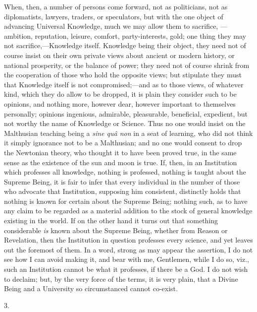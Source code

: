 When, then, a number of persons come forward, not as politicians,
not as diplomatists, lawyers, traders, or speculators, but with the
one object of advancing Universal Knowledge, much we may allow them to
sacrifice, —ambition, reputation, leisure, comfort,
party-interests, gold; one thing they may not sacrifice,—Knowledge
itself. Knowledge being their object, they need not of course insist
on their own private views about ancient or modern history, or
national prosperity, or the balance of power; they need not of course
shrink from the cooperation of those who hold the opposite views; but
stipulate they must that Knowledge itself is not compromised;—and as
to those views, of whatever kind, which they do allow to be dropped,
it is plain they consider such to be opinions, and nothing more,
however dear, however important to themselves personally; opinions
ingenious, admirable, pleasurable, beneficial, expedient, but not
worthy the name of Knowledge or Science. Thus no one would insist on
the Malthusian teaching being a \emph{sine quâ non} in a seat of
learning, who did not think it simply ignorance not to be a
Malthusian; and no one would consent to drop the Newtonian theory, who
thought it to have been proved true, in the same sense as the
existence of the sun and moon is true. If, then, in an Institution
which professes all knowledge, nothing is professed, nothing is taught
about the Supreme Being, it is fair to infer that every individual in
the number of those who advocate that Institution, supposing him
consistent, distinctly holds that nothing is known for certain about
the Supreme Being; nothing such, as to have any claim to be regarded
as a material addition to the stock of general knowledge existing in
the world. If on the other hand it turns out that something
considerable \emph{is} known about the Supreme Being, whether from
Reason or Revelation, then the Institution in question professes every
science, and yet leaves out the foremost of them. In a word, strong as
may appear the assertion, I do not see how I can avoid making it, and
bear with me, Gentlemen, while I do so, viz., such an Institution
cannot be what it professes, if there be a God. I do not wish to
declaim; but, by the very force of the terms, it is very plain, that a
Divine Being and a University so circumstanced cannot co-exist.

3.

